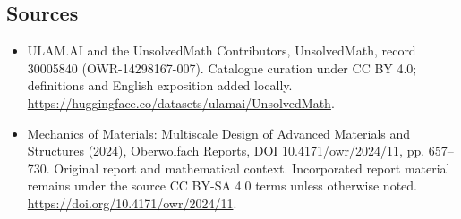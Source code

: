 \documentclass[11pt]{article}
\begin{document}
\subsection{Sources}
\begin{itemize}
\item[\hypertarget{source:30005840:1}{S1}] ULAM.AI and the UnsolvedMath Contributors, UnsolvedMath, record 30005840 (OWR-14298167-007). Catalogue curation under CC BY 4.0; definitions and English exposition added locally.
\url{https://huggingface.co/datasets/ulamai/UnsolvedMath}.
\item[\hypertarget{source:30005840:2}{S2}] Mechanics of Materials: Multiscale Design of Advanced Materials and Structures (2024), Oberwolfach Reports, DOI 10.4171/owr/2024/11, pp. 657--730. Original report and mathematical context. Incorporated report material remains under the source CC BY-SA 4.0 terms unless otherwise noted.
\url{https://doi.org/10.4171/owr/2024/11}.
\end{itemize}
\label{end:30005840}
\end{document}
